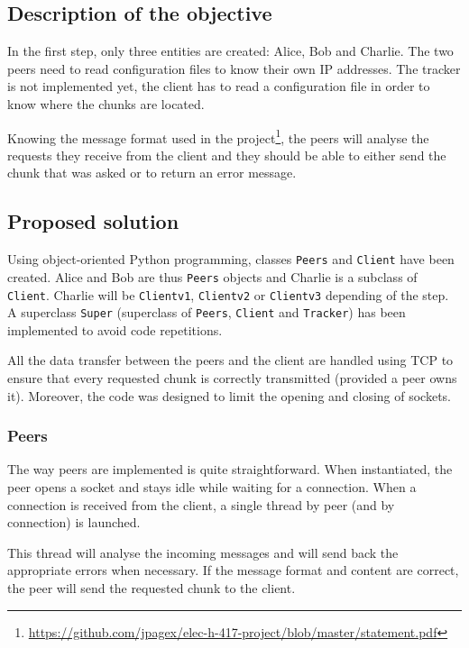 \subsection{Description of the objective}

In the first step, only three entities are created: Alice, Bob and Charlie. The two peers need to read configuration files to know their own IP addresses. The tracker is not implemented yet, the client has to read a configuration file in order to know where the chunks are located.

Knowing the message format used in the project\footnote{\url{https://github.com/jpagex/elec-h-417-project/blob/master/statement.pdf}}, the peers will analyse the requests they receive from the client and they should be able to either send the chunk that was asked or to return an error message.

\subsection{Proposed solution}

Using object-oriented Python programming, classes \texttt{Peers} and \texttt{Client} have been created. Alice and Bob are thus \texttt{Peers} objects and Charlie is a subclass of \texttt{Client}. Charlie will be \texttt{Clientv1}, \texttt{Clientv2} or \texttt{Clientv3} depending of the step. A superclass \texttt{Super} (superclass of \texttt{Peers}, \texttt{Client} and \texttt{Tracker}) has been implemented to avoid code repetitions.

All the data transfer between the peers and the client are handled using TCP to ensure that every requested chunk is correctly transmitted (provided a peer owns it). Moreover, the code was designed to limit the opening and closing of sockets.

\subsubsection{Peers}

The way peers are implemented is quite straightforward. When instantiated, the peer opens a socket and stays idle while waiting for a connection. When a connection is received from the client, a single thread by peer (and by connection) is launched.

This thread will analyse the incoming messages and will send back the appropriate errors when necessary. If the message format and content are correct, the peer will send the requested chunk to the client.

